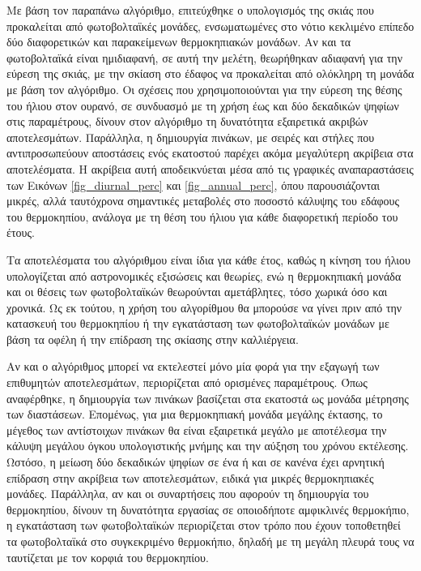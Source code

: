 \documentclass[12pt, a4paper]{report} %
\begin{document}
Με βάση τον παραπάνω αλγόριθμο, επιτεύχθηκε ο υπολογισμός της σκιάς που προκαλείται από φωτοβολταϊκές μονάδες, 
ενσωματωμένες στο νότιο κεκλιμένο επίπεδο δύο διαφορετικών και παρακείμενων θερμοκηπιακών μονάδων. Αν και τα 
φωτοβολταϊκά είναι ημιδιαφανή, σε αυτή την μελέτη, θεωρήθηκαν αδιαφανή για την εύρεση της σκιάς, με την σκίαση στο έδαφος 
να προκαλείται από ολόκληρη τη μονάδα με βάση τον αλγόριθμο. Οι σχέσεις που χρησιμοποιούνται για την εύρεση της θέσης του 
ήλιου στον ουρανό, σε συνδυασμό με τη χρήση έως και δύο δεκαδικών ψηφίων στις παραμέτρους, δίνουν στον αλγόριθμο τη 
δυνατότητα εξαιρετικά ακριβών αποτελεσμάτων. Παράλληλα, η δημιουργία πινάκων, με σειρές και στήλες που αντιπροσωπεύ\-ουν 
αποστάσεις ενός εκατοστού παρέχει ακόμα μεγαλύτερη ακρίβεια στα αποτελέσματα. Η ακρίβεια αυτή αποδεικνύεται μέσα από τις 
γραφικές αναπαραστάσεις των Εικόνων \ref{fig_diurnal_perc} και \ref{fig_annual_perc}, όπου παρουσιάζονται μικρές, αλλά 
ταυτόχρονα σημαντικές μεταβολές στο ποσοστό κάλυψης του εδάφους του θερμοκηπίου, ανάλογα με τη θέση του ήλιου για κάθε 
διαφορετική περίοδο του έτους.

Τα αποτελέσματα του αλγόριθμου είναι ίδια για κάθε έτος, καθώς η κίνηση του ήλιου υπολογίζεται από αστρονομικές εξισώσεις 
και θεωρίες, ενώ η θερμοκηπιακή μονάδα και οι θέσεις των φωτοβολταϊκών θεωρούνται αμετάβλητες, τόσο χωρικά όσο και 
χρονικά. Ως εκ τούτου, η χρήση του αλγορίθμου θα μπορούσε να γίνει πριν από την κατασκευή του θερμοκηπίου ή την 
εγκατάσταση των φωτοβολταϊκών μονάδων με βάση τα οφέλη ή την επίδραση της σκίασης στην καλλιέργεια.

Αν και ο αλγόριθμος μπορεί να εκτελεστεί μόνο μία φορά για την εξαγωγή των επιθυμητών αποτελεσμάτων, περιορίζεται από 
ορισμένες παραμέτρους. Όπως αναφέρθηκε, η δημιουργία των πινάκων βασίζεται στα εκατοστά ως μονάδα μέτρησης των διαστάσεων. 
Επομένως, για μια θερμοκηπιακή μονάδα μεγάλης έκτασης, το μέγεθος των αντίστοιχων πινάκων θα είναι εξαιρετικά μεγάλο με 
αποτέλεσμα την κάλυψη μεγάλου όγκου υπολογιστικής μνήμης και την αύξηση του χρόνου εκτέλεσης. Ωστόσο, η μείωση δύο 
δεκαδικών ψηφίων σε ένα ή και σε κανένα έχει αρνητική επίδραση στην ακρίβεια των αποτελεσμάτων, ειδικά για μικρές 
θερμοκηπιακές μονάδες. Παράλληλα, αν και οι συναρτήσεις που αφορούν τη δημιουργία του θερμοκηπίου, δίνουν τη δυνατότητα 
εργασίας σε οποιοδήποτε αμφικλινές θερμοκήπιο, η εγκατάσταση των φωτοβολταϊκών περιορίζεται στον τρόπο που έχουν 
τοποθετηθεί τα φωτοβολταϊκά στο συγκεκριμένο θερμοκήπιο, δηλαδή με τη μεγάλη πλευρά τους να ταυτίζεται με τον κορφιά του 
θερμοκηπίου.
\end{document}
